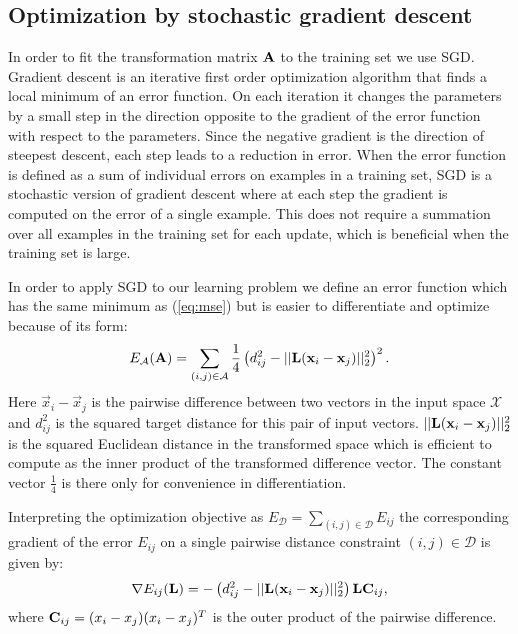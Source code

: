 \subsection{Optimization by stochastic gradient descent}

In order to fit the transformation matrix $\mathbf{A}$ to the training set we use \acf{SGD}. Gradient descent is an iterative first order optimization algorithm that finds a local minimum of an error function. On each iteration it changes the parameters by a small step in the direction opposite to the gradient of the error function with respect to the parameters. Since the negative gradient is the direction of steepest descent, each step leads to a reduction in error. When the error function is defined as a sum of individual errors on examples in a training set, \ac{SGD} is a stochastic version of gradient descent where at each step the gradient is computed on the error of a single example. This does not require a summation over all examples in the training set for each update, which is beneficial when the training set is large. 

In order to apply \ac{SGD} to our learning problem we define an error function which has the same minimum as (\ref{eq:mse}) but is easier to differentiate and optimize because of its form:
\begin{equation}
E_{\mathcal{A}}(\mathbf{A}) =  \sum_{(i,j) \in \mathcal{A}}  \frac{1}{4} \left( d_{ij}^2 - ||\mathbf{L}(\mathbf{x}_i - \mathbf{x}_j)||_2^2 \right )^2.
\label{eq:opt_target}
\end{equation}
Here $\vec{x}_i - \vec{x}_j$ is the pairwise difference between two vectors in the input space $\mathcal{X}$ and $d_{ij}^2$ is the squared target distance for this pair of input vectors. $||\mathbf{L}(\mathbf{x}_i - \mathbf{x}_j)||_2^2$ is the squared Euclidean distance in the transformed space which is efficient to compute as the inner product of the transformed difference vector. The constant vector $\frac{1}{4}$ is there only for convenience in differentiation. 

Interpreting the optimization objective as $E_{\mathcal{D}} = \sum_{(i,j)\in\mathcal{D}} E_{ij}$ the corresponding gradient of the error $E_{ij}$ on a single pairwise distance constraint $(i,j) \in \mathcal{D}$ is given by:
\begin{equation}
\nabla E_{ij}(\mathbf{L})  = - \left ( d_{ij}^2 - ||\mathbf{L}(\mathbf{x}_i - \mathbf{x}_j)||_2^2 \right) \mathbf{L} \mathbf{C}_{ij},
\label{eq:opt_grad}
\end{equation}
where $\mathbf{C}_{ij} = (x_i - x_j)(x_i - x_j)^T$ is the outer product of the pairwise difference.


